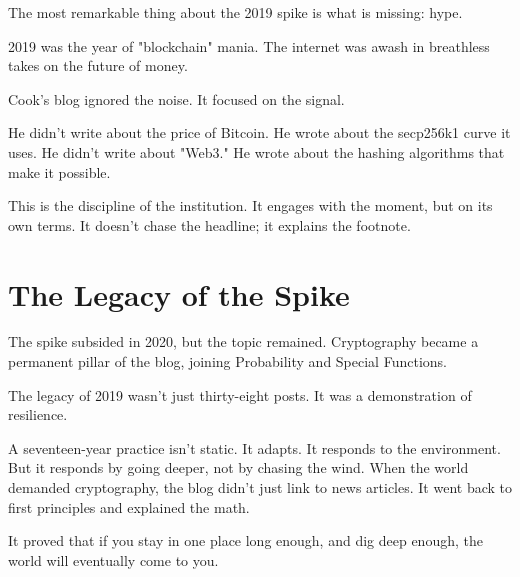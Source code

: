 The most remarkable thing about the 2019 spike is what is missing: hype.

2019 was the year of "blockchain" mania. The internet was awash in breathless takes on the future of money.

Cook's blog ignored the noise. It focused on the signal.

He didn't write about the price of Bitcoin. He wrote about the secp256k1 curve it uses. He didn't write about "Web3." He wrote about the hashing algorithms that make it possible.

This is the discipline of the institution. It engages with the moment, but on its own terms. It doesn't chase the headline; it explains the footnote.

\bigskip

\section*{The Legacy of the Spike}

The spike subsided in 2020, but the topic remained. Cryptography became a permanent pillar of the blog, joining Probability and Special Functions.

The legacy of 2019 wasn't just thirty-eight posts. It was a demonstration of resilience.

A seventeen-year practice isn't static. It adapts. It responds to the environment. But it responds by going deeper, not by chasing the wind. When the world demanded cryptography, the blog didn't just link to news articles. It went back to first principles and explained the math.

It proved that if you stay in one place long enough, and dig deep enough, the world will eventually come to you.

